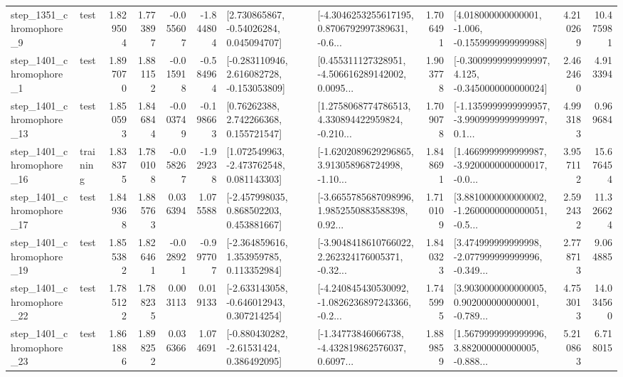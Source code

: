 \begin{tabular}{llrrrrllrlrr}
  step\_1351\_chromophore\_9 &      test &      1.829504 &    1.773897 &     -0.055607 & -1.844804 &     [2.730865867, -0.54026284, 0.045094707] &  [-4.3046253255617195, 0.8706792997389631, -0.6... &       1.706491 &   [4.018000000000001, -1.006, -0.1559999999999988] &            4.210269 &         10.475981 \\
  step\_1401\_chromophore\_1 &      test &      1.897070 &    1.881152 &     -0.015918 & -0.584964 &   [-0.283110946, 2.616082728, -0.153053809] &  [0.455311127328951, -4.506616289142002, 0.0095... &       1.903778 &  [-0.3009999999999997, 4.125, -0.3450000000000024] &            2.462460 &          4.913394 \\
 step\_1401\_chromophore\_13 &      test &      1.850593 &    1.846844 &     -0.003749 & -0.198663 &      [0.76262388, 2.742266368, 0.155721547] &  [1.2758068774786513, 4.330894422959824, -0.210... &       1.709078 &  [-1.1359999999999957, -3.9909999999999997, 0.1... &            4.993183 &          0.969684 \\
 step\_1401\_chromophore\_16 &  training &      1.838375 &    1.780108 &     -0.058267 & -1.929238 &    [1.072549963, -2.473762548, 0.081143303] &  [-1.6202089629296865, 3.913058968724998, -1.10... &       1.848691 &  [1.4669999999999987, -3.9200000000000017, -0.0... &            3.957112 &         15.676454 \\
 step\_1401\_chromophore\_17 &      test &      1.849368 &    1.885763 &      0.036394 &  1.075588 &    [-2.457998035, 0.868502203, 0.453881667] &  [-3.6655785687098996, 1.9852550883588398, 0.92... &       1.710109 &  [3.8810000000000002, -1.2600000000000051, -0.5... &            2.592432 &         11.326624 \\
 step\_1401\_chromophore\_19 &      test &      1.855382 &    1.826461 &     -0.028921 & -0.997707 &    [-2.364859616, 1.353959785, 0.113352984] &  [-3.9048418610766022, 2.262324176005371, -0.32... &       1.840323 &  [3.474999999999998, -2.077999999999996, -0.349... &            2.778713 &          9.064885 \\
 step\_1401\_chromophore\_22 &      test &      1.785122 &    1.788235 &      0.003113 &  0.019133 &   [-2.633143058, -0.646012943, 0.307214254] &  [-4.240845430530092, -1.0826236897243366, -0.2... &       1.745995 &  [3.9030000000000005, 0.902000000000001, -0.789... &            4.753013 &         14.034560 \\
 step\_1401\_chromophore\_23 &      test &      1.861886 &    1.898252 &      0.036366 &  1.074691 &    [-0.880430282, -2.61531424, 0.386492095] &  [-1.34773846066738, -4.432819862576037, 0.6097... &       1.889859 &  [1.5679999999999996, 3.882000000000005, -0.888... &            5.210863 &          6.718015 \\

\end{tabular}
